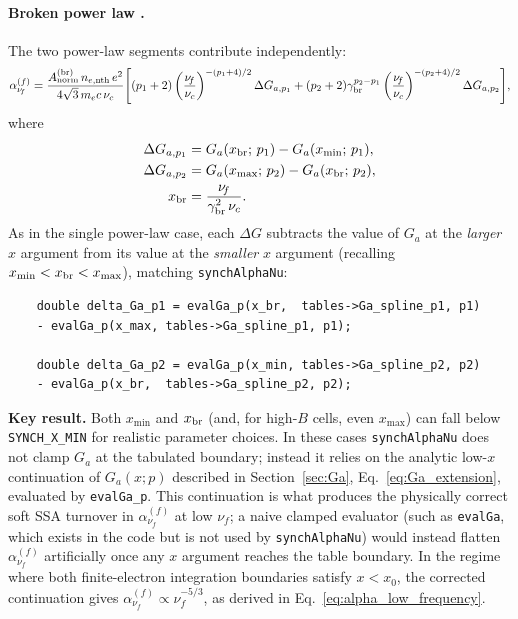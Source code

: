 \documentclass[12pt,a4paper]{article}
\newcommand{\nuf}{\nu_{\!f}}
\newcommand{\nuc}{\nu_c}
\newcommand{\gbr}{\gamma_{\mathrm{br}}}
\newcommand{\nenth}{n_{e,\mathrm{nth}}}
\newcommand{\code}[1]{\texttt{#1}}
\newcommand{\raikou}{\textsc{Raikou}}
\newenvironment{keyresult}{%
	\begin{framed}\noindent\textbf{Key result.}\quad}
	{\end{framed}}
\begin{document}
\paragraph{Broken power law \citep[\raikou{} Eq.~C4]{kawashima2023}.}
The two power-law segments contribute independently:
\begin{equation}
	\alpha_{\nuf}^{(f)}
	=
	\frac{A_{\rm norm}^{(\mathrm{br})}\,\nenth\,e^2}
	{4\sqrt{3}\,m_e c\,\nuc}
	\Biggl[
	(p_1+2)
	\left(\frac{\nuf}{\nuc}\right)^{-(p_1+4)/2}
	\Delta G_{a,p_1}
	+
	(p_2+2)\gbr^{p_2-p_1}
	\left(\frac{\nuf}{\nuc}\right)^{-(p_2+4)/2}
	\Delta G_{a,p_2}
	\Biggr],
	\label{eq:alpha_bpl}
\end{equation}
where
\begin{align}
	\Delta G_{a,p_1} &= G_a(x_{\rm br};\,p_1) - G_a(x_{\min};\,p_1), \\
	\Delta G_{a,p_2} &= G_a(x_{\max};\,p_2) - G_a(x_{\rm br};\,p_2), \\
	x_{\rm br}       &= \frac{\nuf}{\gbr^2\,\nuc}.
\end{align}
As in the single power-law case, each $\Delta G$ subtracts the value of
$G_a$ at the \emph{larger} $x$ argument from its value at the
\emph{smaller} $x$ argument (recalling $x_{\min} < x_{\rm br} <
x_{\max}$), matching \code{synchAlphaNu}:
\begin{verbatim}
	double delta_Ga_p1 = evalGa_p(x_br,  tables->Ga_spline_p1, p1)
	- evalGa_p(x_max, tables->Ga_spline_p1, p1);
	
	double delta_Ga_p2 = evalGa_p(x_min, tables->Ga_spline_p2, p2)
	- evalGa_p(x_br,  tables->Ga_spline_p2, p2);
\end{verbatim}

\begin{keyresult}
	Both $x_{\min}$ and $x_{\rm br}$ (and, for high-$B$ cells, even
	$x_{\max}$) can fall below \code{SYNCH\_X\_MIN} for realistic
	parameter choices. In these cases \code{synchAlphaNu} does not clamp
	$G_a$ at the tabulated boundary; instead it relies on the analytic
	low-$x$ continuation of $G_a(x;p)$ described in
	Section~\ref{sec:Ga}, Eq.~\eqref{eq:Ga_extension}, evaluated by
	\code{evalGa\_p}. This continuation is what produces the physically
	correct soft SSA turnover in $\alpha_{\nuf}^{(f)}$ at low $\nuf$; a
	naive clamped evaluator (such as \code{evalGa}, which exists in the
	code but is not used by \code{synchAlphaNu}) would instead flatten
	$\alpha_{\nuf}^{(f)}$ artificially once any $x$ argument reaches the
	table boundary. In the regime where both finite-electron integration boundaries satisfy
	$x<x_0$, the corrected continuation gives
	$\alpha_{\nuf}^{(f)}\propto\nuf^{-5/3}$, as derived in
	Eq.~\eqref{eq:alpha_low_frequency}.
\end{keyresult}
\end{document}
